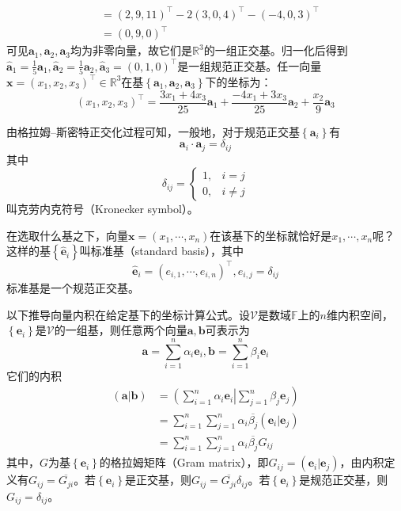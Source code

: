 \documentclass[../main.tex]{subfiles}
\begin{document}
\begin{example}
\begin{align*}
                     & =\left(2,9,11\right)^\intercal-2\left(3,0,4\right)^\intercal-\left(-4,0,3\right)^\intercal                                                                                                                                                                                                                                                                           \\
                     & =\left(0,9,0\right)^\intercal
    \end{align*}
    可见$\mathbf{a}_1,\mathbf{a}_2,\mathbf{a}_3$均为非零向量，故它们是$\mathbb{R}^3$的一组正交基。归一化后得到$\mathbf{\hat{a}}_1=\frac{1}{5}\mathbf{a}_1,\mathbf{\hat{a}}_2=\frac{1}{5}\mathbf{a}_2,\mathbf{\hat{a}}_3=\left(0,1,0\right)^\intercal$是一组规范正交基。任一向量$\mathbf{x}=\left(x_1,x_2,x_3\right)^\intercal\in\mathbb{R}^3$在基$\left\{\mathbf{a}_1,\mathbf{a}_2,\mathbf{a}_3\right\}$下的坐标为：
    \[\left(x_1,x_2,x_3\right)^\intercal=\frac{3x_1+4x_3}{25}\mathbf{a}_1+\frac{-4x_1+3x_3}{25}\mathbf{a}_2+\frac{x_2}{9}\mathbf{a}_3\]

    由格拉姆--斯密特正交化过程可知，一般地，对于规范正交基$\left\{\mathbf{a}_i\right\}$有
    \[\mathbf{a}_i\cdot\mathbf{a}_j=\delta_{ij}\]
    其中
    \[\delta_{ij}=\left\{\begin{array}{ll}
            1, & i=j     \\
            0, & i\neq j
        \end{array}\right.
    \]
    叫克劳内克符号（Kronecker symbol）。

    在选取什么基之下，向量$\mathbf{x}=\left(x_1,\cdots,x_n\right)$在该基下的坐标就恰好是$x_1,\cdots,x_n$呢？这样的基$\left\{\mathbf{\hat{e}}_i\right\}$叫标准基（standard basis），其中
    \[\mathbf{\hat{e}}_i=\left(e_{i,1},\cdots,e_{i,n}\right)^\intercal,e_{i,j}=\delta_{ij}\]
    标准基是一个规范正交基。
\end{example}

以下推导向量内积在给定基下的坐标计算公式。设$\mathcal{V}$是数域$\mathbb{F}$上的$n$维内积空间，$\left\{\mathbf{e}_i\right\}$是$\mathcal{V}$的一组基，则任意两个向量$\mathbf{a},\mathbf{b}$可表示为
\[
    \mathbf{a}=\sum_{i=1}^n\alpha_i\mathbf{e}_i,\mathbf{b}=\sum_{i=1}^n\beta_i\mathbf{e}_i
\]
它们的内积
\begin{align*}
    \left(\mathbf{a}|\mathbf{b}\right) & =\left(\sum_{i=1}^n\alpha_i\mathbf{e}_i\right|\left.\sum_{j=1}^n\beta_j\mathbf{e}_j\right) \\
                                       & =\sum_{i=1}^n\sum_{j=1}^n\alpha_i\overline{\beta_j}\left(\mathbf{e}_i|\mathbf{e}_j\right)  \\
                                       & =\sum_{i=1}^n\sum_{j=1}^n\alpha_i\overline{\beta_j}G_{ij}
\end{align*}
其中，$G$为基$\left\{\mathbf{e}_i\right\}$的格拉姆矩阵（Gram matrix），即$G_{ij}=\left(\mathbf{e}_i|\mathbf{e}_j\right)$，由内积定义有$G_{ij}=\overline{G_{ji}}$。若$\left\{\mathbf{e}_i\right\}$是正交基，则$G_{ij}=\overline{G_{ji}}\delta_{ij}$。若$\left\{\mathbf{e}_i\right\}$是规范正交基，则$G_{ij}=\delta_{ij}$。
\end{document}
